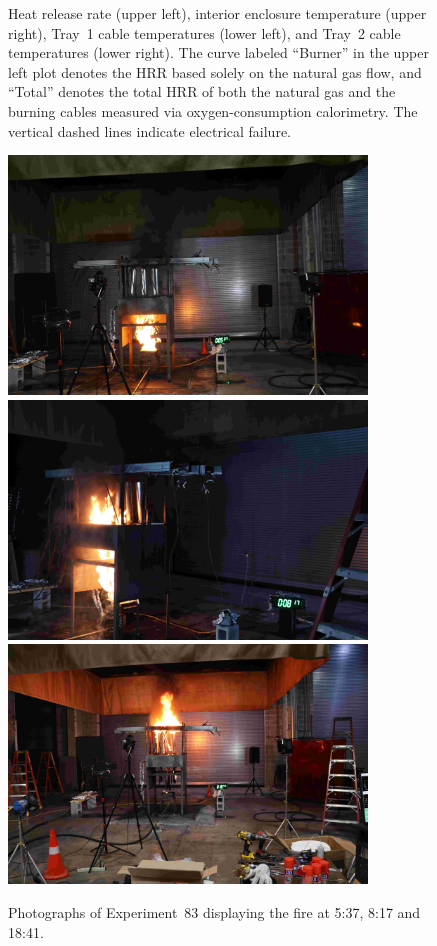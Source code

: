 \begin{figure}[H]
\caption[HRR and temperatures of Experiment 83]{Heat release rate (upper left), interior enclosure temperature (upper right), Tray~1 cable temperatures (lower left), and Tray~2 cable temperatures (lower right). The curve labeled ``Burner'' in the upper left plot denotes the HRR based solely on the natural gas flow, and ``Total'' denotes the total HRR of both the natural gas and the burning cables measured via oxygen-consumption calorimetry. The vertical dashed lines indicate electrical failure.}
\label{fig:Test_83}
\end{figure}

\begin{figure}[p]
\centering
\includegraphics[height=2.50in]{../FIGURES/Test_83_Photo_1} \\ \vspace{0.1in}
\includegraphics[height=2.50in]{../FIGURES/Test_83_Photo_2} \\ \vspace{0.1in}
\includegraphics[height=2.50in]{../FIGURES/Test_83_Photo_3}
\caption[Photographs of Experiment~83]{Photographs of Experiment~83 displaying the fire at 5:37, 8:17 and 18:41.}
\label{fig:Test_83_photos}
\end{figure}



